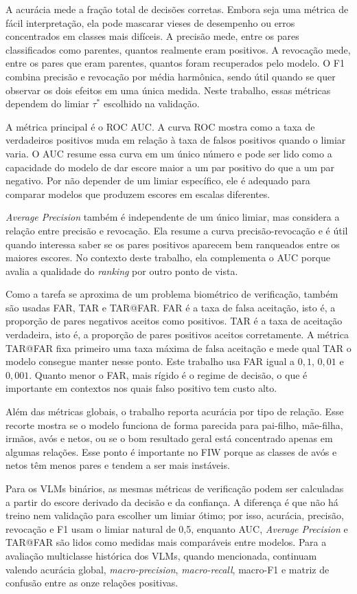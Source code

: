 A acurácia mede a fração total de decisões corretas. Embora seja uma métrica de fácil interpretação, ela pode mascarar vieses de desempenho ou erros concentrados em classes mais difíceis. A precisão mede, entre os pares classificados como parentes, quantos realmente eram positivos. A revocação mede, entre os pares que eram parentes, quantos foram recuperados pelo modelo. O F1 combina precisão e revocação por média harmônica, sendo útil quando se quer observar os dois efeitos em uma única medida. Neste trabalho, essas métricas dependem do limiar $\tau^*$ escolhido na validação.

A métrica principal é o ROC AUC. A curva ROC mostra como a taxa de verdadeiros positivos muda em relação à taxa de falsos positivos quando o limiar varia. O AUC resume essa curva em um único número e pode ser lido como a capacidade do modelo de dar escore maior a um par positivo do que a um par negativo. Por não depender de um limiar específico, ele é adequado para comparar modelos que produzem escores em escalas diferentes.

\textit{Average Precision} também é independente de um único limiar, mas considera a relação entre precisão e revocação. Ela resume a curva precisão-revocação e é útil quando interessa saber se os pares positivos aparecem bem ranqueados entre os maiores escores. No contexto deste trabalho, ela complementa o AUC porque avalia a qualidade do \textit{ranking} por outro ponto de vista.

Como a tarefa se aproxima de um problema biométrico de verificação, também são usadas FAR, TAR e TAR@FAR. FAR é a taxa de falsa aceitação, isto é, a proporção de pares negativos aceitos como positivos. TAR é a taxa de aceitação verdadeira, isto é, a proporção de pares positivos aceitos corretamente. A métrica TAR@FAR fixa primeiro uma taxa máxima de falsa aceitação e mede qual TAR o modelo consegue manter nesse ponto. Este trabalho usa FAR igual a $0{,}1$, $0{,}01$ e $0{,}001$. Quanto menor o FAR, mais rígido é o regime de decisão, o que é importante em contextos nos quais falso positivo tem custo alto.

Além das métricas globais, o trabalho reporta acurácia por tipo de relação. Esse recorte mostra se o modelo funciona de forma parecida para pai-filho, mãe-filha, irmãos, avós e netos, ou se o bom resultado geral está concentrado apenas em algumas relações. Esse ponto é importante no FIW porque as classes de avós e netos têm menos pares e tendem a ser mais instáveis.

Para os VLMs binários, as mesmas métricas de verificação podem ser calculadas a partir do escore derivado da decisão e da confiança. A diferença é que não há treino nem validação para escolher um limiar ótimo; por isso, acurácia, precisão, revocação e F1 usam o limiar natural de 0,5, enquanto AUC, \textit{Average Precision} e TAR@FAR são lidos como medidas mais comparáveis entre modelos. Para a avaliação multiclasse histórica dos VLMs, quando mencionada, continuam valendo acurácia global, \textit{macro-precision}, \textit{macro-recall}, macro-F1 e matriz de confusão entre as onze relações positivas.

